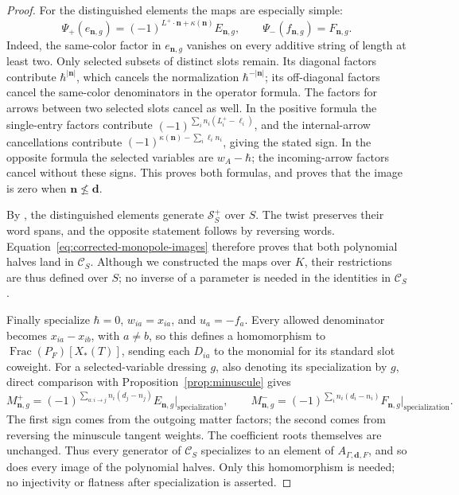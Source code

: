 \begin{proof}
For the distinguished elements the maps are especially simple:
\begin{equation}\label{eq:corrected-monopole-images}
 \Psi_+(e_{\mathbf n,g})
   =(-1)^{L^+\cdot\mathbf n+\kappa(\mathbf n)}E_{\mathbf n,g},
 \qquad
 \Psi_-(f_{\mathbf n,g})=F_{\mathbf n,g}.
\end{equation}
Indeed, the same-color factor in \(e_{\mathbf n,g}\) vanishes on every
additive string of length at least two.  Only selected subsets of
distinct slots remain.  Its diagonal factors contribute
\(\hbar^{|\mathbf n|}\), which cancels the normalization
\(\hbar^{-|\mathbf n|}\); its off-diagonal factors cancel the
same-color denominators in the operator formula.  The factors for
arrows between two selected slots cancel as well.
In the positive formula the single-entry factors contribute
\((-1)^{\sum_i n_i(L_i^+-\ell_i)}\), and the internal-arrow
cancellations contribute
\((-1)^{\kappa(\mathbf n)-\sum_i\ell_i n_i}\), giving the stated sign.
In the opposite formula the selected variables are \(w_A-\hbar\);
the incoming-arrow factors cancel without these signs.
This proves both formulas, and proves that the image is zero when
\(\mathbf n\not\leq\mathbf d\).

By \cite[Theorem~2.4]{JindalNegut26}, the distinguished elements generate
\(\mathcal S_S^+\) over \(S\).  The twist preserves their word spans,
and the opposite statement follows by reversing words.
Equation~\eqref{eq:corrected-monopole-images} therefore proves that
both polynomial halves land in \(\mathcal C_S\).
Although we constructed the maps over \(K\), their restrictions are
thus defined over \(S\); no inverse of a parameter is needed in the
identities in \(\mathcal C_S\).

Finally specialize \(\hbar=0\), \(w_{ia}=x_{ia}\), and \(u_a=-f_a\).
Every allowed denominator becomes \(x_{ia}-x_{ib}\), with \(a\ne b\),
so this defines a homomorphism to
\(\operatorname{Frac}(P_F)[X_*(T)]\), sending each \(D_{ia}\)
to the monomial for its standard slot coweight.
For a selected-variable dressing \(g\), also denoting its specialization
by \(g\), direct comparison with Proposition~\ref{prop:minuscule} gives
\[
 M^+_{\mathbf n,g}
   =(-1)^{\sum_{a:i\to j}n_i(d_j-n_j)}
          E_{\mathbf n,g}\big|_{\mathrm{specialization}},
 \qquad
 M^-_{\mathbf n,g}
   =(-1)^{\sum_i n_i(d_i-n_i)}
          F_{\mathbf n,g}\big|_{\mathrm{specialization}}.
\]
The first sign comes from the outgoing matter factors; the second
comes from reversing the minuscule tangent weights.
The coefficient roots themselves are unchanged.
Thus every generator of \(\mathcal C_S\) specializes to an element
of \(A_{\Gamma,\mathbf d,F}\), and so does every image of the
polynomial halves.  Only this homomorphism is needed; no injectivity
or flatness after specialization is asserted.
\end{proof}

